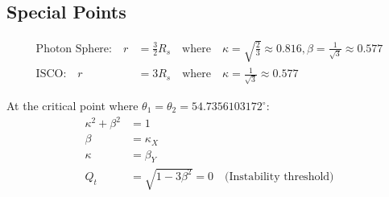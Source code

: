 \documentclass[12pt, a4paper]{article}
\begin{document}
\subsection{Special Points}

\begin{align}
    \text{Photon Sphere:} \quad r &= \frac{3}{2}R_s \quad \text{where} \quad \kappa = \sqrt{\frac{2}{3}} \approx 0.816, \beta = \frac{1}{\sqrt{3}} \approx 0.577 \\
    \text{ISCO:} \quad r &= 3R_s \quad \text{where} \quad \kappa = \frac{1}{\sqrt{3}} \approx 0.577
\end{align}

At the critical point where $\theta_1 = \theta_2 = 54.7356103172^{\circ}$:
\begin{align}
    \kappa^2 + \beta^2 &= 1 \\
    \beta &= \kappa_X \\
    \kappa &= \beta_Y \\
    Q_t &= \sqrt{1-3\beta^2} = 0 \quad \text{(Instability threshold)}
\end{align}
\end{document}
